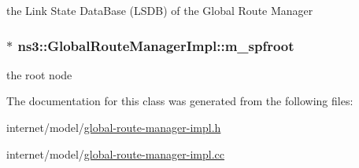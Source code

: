 the Link State Data\+Base (L\+S\+DB) of the Global Route Manager 

\subsubsection[{\texorpdfstring{m\+\_\+spfroot}{m_spfroot}}]{$\ast$ ns3\+::\+Global\+Route\+Manager\+Impl\+::m\+\_\+spfroot\hspace{0.3cm}{\ttfamily [private]}}\hypertarget{classns3_1_1GlobalRouteManagerImpl_a977f6b62ef1f1b58d041a2f49c093a1c}{}\label{classns3_1_1GlobalRouteManagerImpl_a977f6b62ef1f1b58d041a2f49c093a1c}


the root node 



The documentation for this class was generated from the following files\+:\begin{DoxyCompactItemize}
\item 
internet/model/\hyperlink{global-route-manager-impl_8h}{global-\/route-\/manager-\/impl.\+h}\item 
internet/model/\hyperlink{global-route-manager-impl_8cc}{global-\/route-\/manager-\/impl.\+cc}\end{DoxyCompactItemize}
